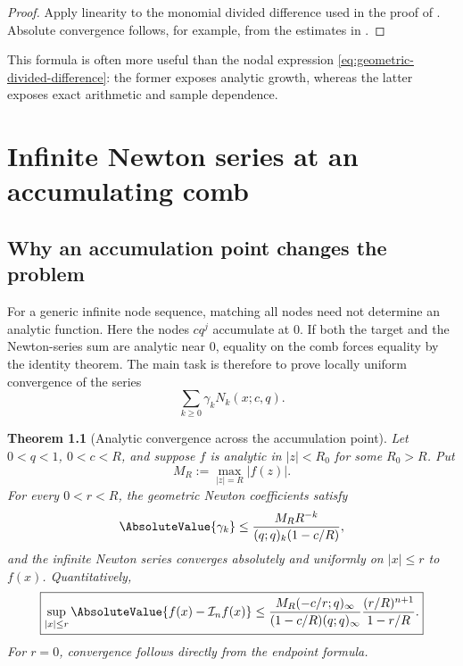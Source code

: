 \documentclass[11pt,oneside]{book}
\numberwithin{equation}{chapter}
\newtheorem{theorem}{Theorem}[chapter]
\theoremstyle{definition}
\theoremstyle{remark}
\newcommand{\Interp}{\mathcal I}
\begin{document}
\begin{proof}
Apply linearity to the monomial divided difference used in the proof of
.  Absolute convergence follows, for example,
from the estimates in .
\end{proof}

This formula is often more useful than the nodal expression
\eqref{eq:geometric-divided-difference}: the former exposes analytic growth,
whereas the latter exposes exact arithmetic and sample dependence.

\chapter{Infinite Newton series at an accumulating comb}
\label{chap:infinite-newton}

\section{Why an accumulation point changes the problem}

For a generic infinite node sequence, matching all nodes need not determine
an analytic function.  Here the nodes $cq^j$ accumulate at $0$.  If both the
target and the Newton-series sum are analytic near $0$, equality on the comb
forces equality by the identity theorem.  The main task is therefore to
prove locally uniform convergence of the series
\begin{equation}
 \sum_{k\ge0}\gamma_kN_k(x;c,q).
 \label{eq:infinite-newton-series}
\end{equation}

\begin{theorem}[Analytic convergence across the accumulation point]
\label{thm:analytic-newton-convergence}
Let $0<q<1$, $0<c<R$, and suppose $f$ is analytic in $|z|<R_0$ for some
$R_0>R$.  Put
\[
 M_R:=\max_{|z|=R}|f(z)|.
\]
For every $0<r<R$, the geometric Newton coefficients satisfy
\begin{equation}
 \AbsoluteValue{\gamma_k}
 \le \frac{M_RR^{-k}}{(q;q)_k(1-c/R)},
 \label{eq:newton-coefficient-bound}
\end{equation}
and the infinite Newton series converges absolutely and uniformly on
$|x|\le r$ to $f(x)$.  Quantitatively,
\begin{equation}
 \boxed{
 \sup_{|x|\le r}\AbsoluteValue{f(x)-\Interp_nf(x)}
 \le
 \frac{M_R(-c/r;q)_\infty}
 {(1-c/R)(q;q)_\infty}
 \frac{(r/R)^{n+1}}{1-r/R}.}
 \label{eq:analytic-convergence-bound}
\end{equation}
For $r=0$, convergence follows directly from the endpoint formula.
\end{theorem}
\end{document}
